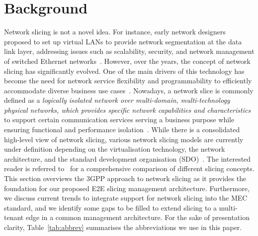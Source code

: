 \section{Background}
\label{sec:background}
\noindent
Network slicing is not a novel idea. For instance, early network designers proposed to set up virtual LANs to provide network segmentation at the data link layer, addressing issues such as scalability, security, and network management of switched Ethernet networks~\cite{2011_commag_vlan}. However, over the years, the concept of network slicing has significantly evolved. One of the main drivers of this technology has become the need for network service flexibility and programmability to efficiently accommodate diverse business use cases~\cite{2018_COMST_slicing_survey}. Nowadays, a network slice is commonly defined as a \textit{logically isolated network over multi-domain, multi-technology physical networks, which provides specific network capabilities and characteristics} to support certain communication services serving a business purpose while ensuring functional and performance isolation~\cite{2020_ACCESS_slicing_survey}. While there is a consolidated high-level view of network slicing, various network slicing models are currently under definition depending on the virtualisation technology, the network architecture, and the standard development organisation (SDO)~\cite{NGMN028,2017_foukas_5G_slicing,Cominardi2020}. The interested reader is referred to~\cite{MEC024} for a comprehensive comparison of different slicing concepts. This section overviews the 3GPP approach to network slicing as it provides the foundation for our proposed E2E slicing management architecture. Furthermore, we discuss current trends to integrate support for network slicing into the MEC standard, and we identify some gaps to be filled to extend slicing to a multi-tenant edge in a common management architecture. For the sake of presentation clarity, Table~\ref{tab:abbrev} summarises the abbreviations we use in this paper. 
%
